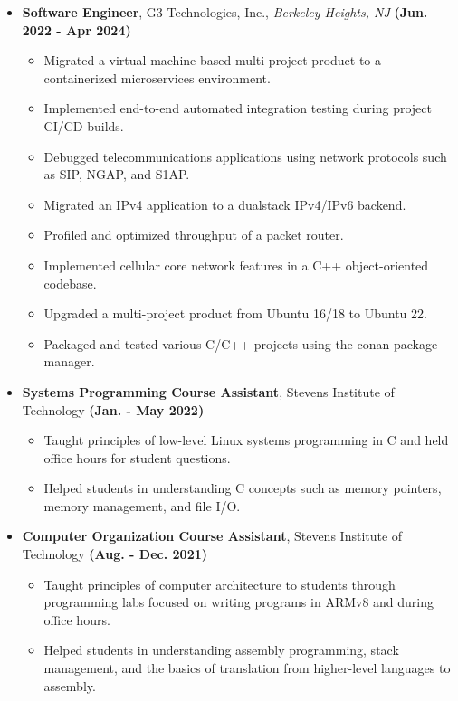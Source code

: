 \documentclass[11pt]{article}
\begin{document}
\begin{flushleft}
\begin{itemize}
\begin{itemize}
            \item \textbf{Software Engineer}, G3 Technologies, Inc., \textit{Berkeley Heights, NJ} \hfill{\textbf{(Jun. 2022 - Apr 2024)}}
                \begin{itemize}
                    \item Migrated a virtual machine-based multi-project product to a containerized microservices environment.
                    \item Implemented end-to-end automated integration testing during project CI/CD builds.
                    \item Debugged telecommunications applications using network protocols such as SIP, NGAP, and S1AP.
                    \item Migrated an IPv4 application to a dualstack IPv4/IPv6 backend.
                    \item Profiled and optimized throughput of a packet router.
                    \item Implemented cellular core network features in a C++ object-oriented codebase.
                    \item Upgraded a multi-project product from Ubuntu 16/18 to Ubuntu 22.
                    \item Packaged and tested various C/C++ projects using the conan package manager.
                \end{itemize}
            \item \textbf{Systems Programming Course Assistant}, Stevens Institute of Technology \hfill{\textbf{(Jan. - May 2022)}}
                \begin{itemize}
                    \item Taught principles of low-level Linux systems programming in C and held office hours for student questions.
                    \item Helped students in understanding C concepts such as memory pointers, memory management, and file I/O.
                \end{itemize}
            \item \textbf{Computer Organization Course Assistant}, Stevens Institute of Technology \hfill{\textbf{(Aug. - Dec. 2021)}}
                \begin{itemize}
                    \item Taught principles of computer architecture to students through programming labs focused on writing programs in ARMv8 and during office hours.
                    \item Helped students in understanding assembly programming, stack management, and the basics of translation from higher-level languages to assembly.

\end{itemize}
\end{itemize}
\end{itemize}
\end{flushleft}
\end{document}
